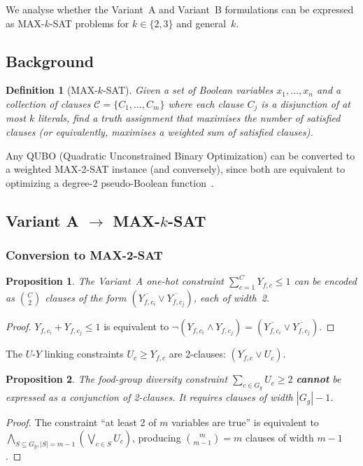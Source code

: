\documentclass[11pt,a4paper]{article}
\newtheorem{proposition}{Proposition}
\newtheorem{definition}{Definition}
\begin{document}
We analyse whether the Variant~A and Variant~B formulations can be expressed as
MAX-$k$-SAT problems for $k \in \{2, 3\}$ and general~$k$.

\subsection{Background}

\begin{definition}[MAX-$k$-SAT]
Given a set of Boolean variables $x_1, \ldots, x_n$ and a collection of clauses
$\mathcal{C} = \{C_1, \ldots, C_m\}$ where each clause $C_j$ is a disjunction of
at most $k$ literals, find a truth assignment that maximises the number of satisfied
clauses (or equivalently, maximises a weighted sum of satisfied clauses).
\end{definition}

Any QUBO (Quadratic Unconstrained Binary Optimization) can be converted to a
weighted MAX-2-SAT instance (and conversely), since both are equivalent to optimizing
a degree-2 pseudo-Boolean function~\cite{boros2002pseudo}.

\subsection{Variant A $\to$ MAX-$k$-SAT}

\subsubsection*{Conversion to MAX-2-SAT}

\begin{proposition}
The Variant~A one-hot constraint $\sum_{c=1}^{C} Y_{f,c} \le 1$ can be encoded
as $\binom{C}{2}$ clauses of the form $(\overline{Y_{f,c_i}} \lor \overline{Y_{f,c_j}})$,
each of width~2.
\end{proposition}
\begin{proof}
$Y_{f,c_i} + Y_{f,c_j} \le 1$ is equivalent to $\neg(Y_{f,c_i} \wedge Y_{f,c_j})
= (\overline{Y_{f,c_i}} \lor \overline{Y_{f,c_j}})$.
\end{proof}

The $U$-$Y$ linking constraints $U_c \ge Y_{f,c}$ are 2-clauses:
$(\overline{Y_{f,c}} \lor U_c)$.

\begin{proposition}
The food-group diversity constraint $\sum_{c \in G_g} U_c \ge 2$ \textbf{cannot}
be expressed as a conjunction of 2-clauses.  It requires clauses of width
$|G_g| - 1$.
\end{proposition}
\begin{proof}
The constraint ``at least 2 of $m$ variables are true'' is equivalent to
$\bigwedge_{S \subseteq G_g, |S|=m-1} \left(\bigvee_{c \in S} U_c\right)$,
producing $\binom{m}{m-1} = m$ clauses of width $m - 1$.
\end{proof}
\end{document}

